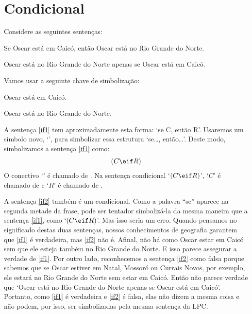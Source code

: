 \section{Condicional}
Considere as seguintes sentenças:
	\begin{earg}
		\item[\ex{if1}] Se Oscar está em Caicó, então Oscar está no Rio Grande do Norte.
		\item[\ex{if2}] Oscar está no Rio Grande do Norte apenas se Oscar está em Caicó.
	\end{earg}
Vamos usar a seguinte chave de simbolização:
	\begin{ekey}
		\item[C] Oscar está em Caicó.
		\item[R] Oscar está no Rio Grande do Norte.
	\end{ekey}
A sentença \ref{if1} tem aproximadamente esta forma: `se C, então R'.
Usaremos um símbolo novo, `\eif', para simbolizar essa estrutura `se\ldots, então\ldots'.
Deste modo, simbolizamos a sentença \ref{if1} como:
$$(C \eif R)$$
O conectivo `\eif' é chamado de .
Na sentença condicional `$(C \eif R)$', `$C$' é chamado de  e `$R$' é chamado de .

A sentença \ref{if2} também é um condicional.
Como a palavra ``se'' aparece na segunda metade da frase, pode ser tentador simbolizá-la da mesma maneira que a sentença \ref{if1}, como `$(C \eif R)$'.
Mas isso seria um erro.
Quando pensamos no significado destas duas sentenças, nossos conhecimentos de geografia garantem que \ref{if1} é verdadeira, mas \ref{if2} não é.
Afinal, não há como Oscar estar em Caicó sem que ele esteja também no Rio Grande do Norte.
E isso parece assegurar a verdade de \ref{if1}.
Por outro lado, reconhecemos a sentença \ref{if2} como falsa porque sabemos que se Oscar estiver em Natal, Mossoró ou Currais Novos, por exemplo, ele estará no Rio Grande do Norte sem estar em Caicó.
Então não parece verdade que `Oscar está no Rio Grande do Norte apenas se Oscar está em Caicó'.
Portanto, como \ref{if1} é verdadeira e \ref{if2} é falsa, elas não dizem a mesma coisa e não podem, por isso, ser simbolizadas pela mesma sentença da  LPC.

